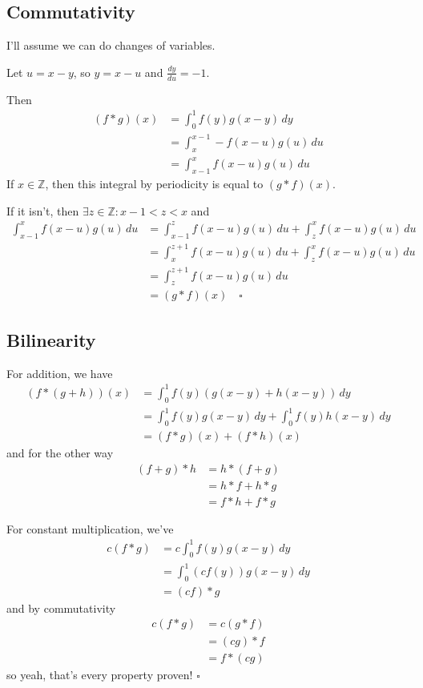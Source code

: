 \documentclass[12pt]{article}
\newcommand{\Z}{\mathbb{Z}}
\begin{document}
\pagebreak

\subsection{Commutativity}

I'll assume we can do changes of variables.

Let $u=x-y$, so $y=x-u$ and $\frac{dy}{du}=-1$.

Then
\begin{align*}
  (f*g)(x)
   & = \int_{0}^{1} f(y)g(x-y)\,dy    \\
   & = \int_{x}^{x-1} -f(x-u)g(u)\,du \\
   & = \int_{x-1}^{x} f(x-u)g(u)\,du
\end{align*}
If $x \in \Z$, then this integral by periodicity is equal to $(g * f)(x)$.

If it isn't, then $\exists z \in \Z: x-1 < z < x$ and
\begin{align*}
  \int_{x-1}^{x} f(x-u)g(u)\,du
  &= \int_{x-1}^{z} f(x-u)g(u)\,du + \int_{z}^{x} f(x-u)g(u)\,du \\
  &= \int_{x}^{z+1} f(x-u)g(u)\,du + \int_{z}^{x} f(x-u)g(u)\,du \\
  &= \int_{z}^{z+1} f(x-u)g(u)\,du \\
  &= (g * f)(x)\quad\square
\end{align*}

\pagebreak

\subsection{Bilinearity}

For addition, we have
\begin{align*}
  (f * (g + h))(x)
   & = \int_{0}^{1} f(y)(g(x-y)+h(x-y))\,dy                      \\
   & = \int_{0}^{1} f(y)g(x-y)\,dy + \int_{0}^{1} f(y)h(x-y)\,dy \\
   & = (f * g)(x) + (f * h)(x)
\end{align*}
and for the other way
\begin{align*}
  (f + g) * h
   & = h * (f + g)   \\
   & = h * f + h * g \\
   & = f * h + f * g
\end{align*}

For constant multiplication, we've
\begin{align*}
  c(f * g)
   & = c\int_{0}^{1} f(y)g(x-y)\,dy   \\
   & = \int_{0}^{1} (cf(y))g(x-y)\,dy \\
   & = (cf) * g
\end{align*}
and by commutativity
\begin{align*}
  c(f * g)
   & = c(g *f)  \\
   & = (cg) * f \\
   & = f * (cg)
\end{align*}
so yeah, that's every property proven! $\square$
\end{document}
